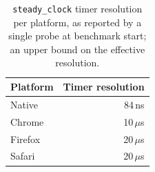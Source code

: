 \begin{table}[t]
\caption{\texttt{steady\_clock} timer resolution per platform, as reported
         by a single probe at benchmark start; an upper bound on the
         effective resolution.}
\label{tab:timer-resolution}
\centering
\begin{tabular}{lr}
\hline
\textbf{Platform} & \textbf{Timer resolution} \\
\hline
Native & 84\,ns \\
Chrome & 10\,$\mu$s \\
Firefox & 20\,$\mu$s \\
Safari & 20\,$\mu$s \\
\hline
\end{tabular}
\end{table}
